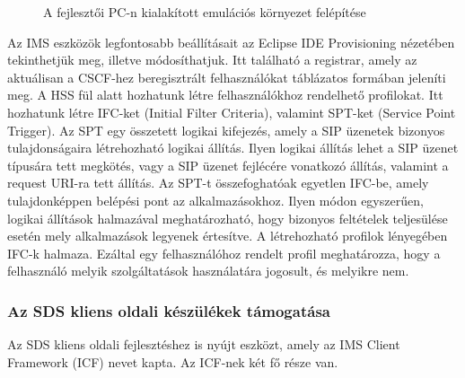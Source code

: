 \begin{figure}[htbp]
\center
{}
\caption{A fejlesztői PC-n kialakított emulációs környezet felépítése~\cite{sds_tech_desc}}
\label{fig:sds_env}
\end{figure}

Az IMS eszközök legfontosabb beállításait az Eclipse IDE Provisioning nézetében tekinthetjük meg, illetve módosíthatjuk. Itt található a registrar, amely az aktuálisan a CSCF-hez beregisztrált felhasználókat táblázatos formában jeleníti meg. A HSS fül alatt hozhatunk létre felhasználókhoz rendelhető profilokat. Itt hozhatunk létre IFC-ket (Initial Filter Criteria), valamint SPT-ket (Service Point Trigger). Az SPT egy összetett logikai kifejezés, amely a SIP üzenetek bizonyos tulajdonságaira létrehozható logikai állítás. Ilyen logikai állítás lehet a SIP üzenet típusára tett megkötés, vagy a SIP üzenet fejlécére vonatkozó állítás, valamint a request URI-ra tett állítás. Az SPT-t összefoghatóak egyetlen IFC-be, amely tulajdonképpen belépési pont az alkalmazásokhoz. Ilyen módon egyszerűen, logikai állítások halmazával meghatározható, hogy bizonyos feltételek teljesülése esetén mely alkalmazások legyenek értesítve. A létrehozható profilok lényegében IFC-k halmaza. Ezáltal egy felhasználóhoz rendelt profil meghatározza, hogy a felhasználó melyik szolgáltatások használatára jogosult, és melyikre nem. 

\subsubsection{Az SDS kliens oldali készülékek támogatása}

Az SDS kliens oldali fejlesztéshez is nyújt eszközt, amely az IMS Client Framework (ICF) nevet kapta. Az ICF-nek két fő része van. 

